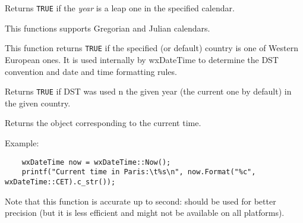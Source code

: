 

\label{wxdatetimeisleapyear}


Returns {\tt TRUE} if the {\it year} is a leap one in the specified calendar.

This functions supports Gregorian and Julian calendars.

\label{wxdatetimeiswesteuropeancountry}


This function returns {\tt TRUE} if the specified (or default) country is one
of Western European ones. It is used internally by wxDateTime to determine the
DST convention and date and time formatting rules.

\label{wxdatetimeisdstapplicable}


Returns {\tt TRUE} if DST was used n the given year (the current one by
default) in the given country.

\label{wxdatetimenow}


Returns the object corresponding to the current time.

Example:

\begin{verbatim}
    wxDateTime now = wxDateTime::Now();
    printf("Current time in Paris:\t%s\n", now.Format("%c", wxDateTime::CET).c_str());
\end{verbatim}

Note that this function is accurate up to second: 
 should be used for better precision
(but it is less efficient and might not be available on all platforms).



\label{wxdatetimesetcountry}

